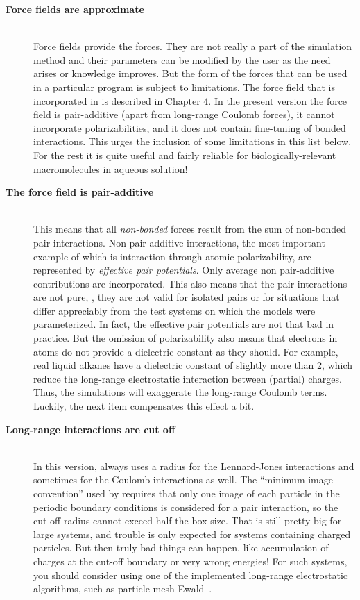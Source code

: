 \begin{description}
\item[{\bf Force fields are approximate}]\mbox{}\\
Force fields  provide the forces.
They are not really a part of the
simulation method and their parameters can be modified by the user as the
need arises or knowledge improves. But the form of the forces that can
be used in a particular program is subject to limitations. The force
field that is incorporated in {\gromacs} is described in Chapter 4. In
the present version the force field is pair-additive (apart from
long-range Coulomb forces), it cannot incorporate
polarizabilities, and it does not contain fine-tuning of bonded
interactions. This urges the inclusion of some limitations in this
list below.  For the rest it is quite useful and fairly reliable for
biologically-relevant macromolecules in aqueous solution!

\item[{\bf The force field is pair-additive}]\mbox{}\\
This means that all {\em non-bonded} forces result from the sum of
non-bonded pair interactions. Non pair-additive interactions, the most
important example of which is interaction through atomic
polarizability, are represented by {\em effective pair
potentials}. Only average non pair-additive contributions are
incorporated. This also means that the pair interactions are not pure,
{\ie}, they are not valid for isolated pairs or for situations
that differ appreciably from the test systems on which the models were
parameterized. In fact, the effective pair potentials are not that bad
in practice. But the omission of polarizability also means that
electrons in atoms do not provide a dielectric constant as they
should. For example, real liquid alkanes have a dielectric constant of
slightly more than 2, which reduce the long-range electrostatic
interaction between (partial) charges. Thus, the simulations will
exaggerate the long-range Coulomb terms. Luckily, the next item
compensates this effect a bit.

\item[{\bf Long-range interactions are cut off}]\mbox{}\\
In this version, {\gromacs} always uses a  radius for the
Lennard-Jones interactions and sometimes for the Coulomb interactions
as well. The ``minimum-image convention'' used by {\gromacs} requires that only one image of each
particle in the periodic boundary conditions is considered for a pair
interaction, so the cut-off radius cannot exceed half the box size. That
is still pretty big for large systems, and trouble is only expected
for systems containing charged particles. But then truly bad things can
happen, like accumulation of charges at the cut-off boundary or very
wrong energies! For such systems, you should consider using one of the
implemented long-range electrostatic algorithms, such as 
particle-mesh Ewald~\cite{Darden93,Essmann95}.


\end{description}
